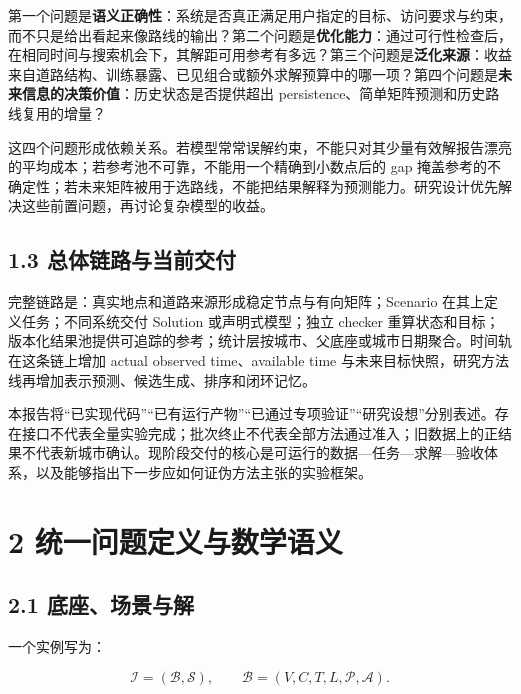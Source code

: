 \documentclass[UTF8,10pt,a4paper,fontset=fandol]{ctexart}
\begin{document}

第一个问题是\textbf{语义正确性}：系统是否真正满足用户指定的目标、访问要求与约束，而不只是给出看起来像路线的输出？第二个问题是\textbf{优化能力}：通过可行性检查后，在相同时间与搜索机会下，其解距可用参考有多远？第三个问题是\textbf{泛化来源}：收益来自道路结构、训练暴露、已见组合或额外求解预算中的哪一项？第四个问题是\textbf{未来信息的决策价值}：历史状态是否提供超出 persistence、简单矩阵预测和历史路线复用的增量？


这四个问题形成依赖关系。若模型常常误解约束，不能只对其少量有效解报告漂亮的平均成本；若参考池不可靠，不能用一个精确到小数点后的 gap 掩盖参考的不确定性；若未来矩阵被用于选路线，不能把结果解释为预测能力。研究设计优先解决这些前置问题，再讨论复杂模型的收益。


\subsection*{1.3 总体链路与当前交付}


完整链路是：真实地点和道路来源形成稳定节点与有向矩阵；Scenario 在其上定义任务；不同系统交付 Solution 或声明式模型；独立 checker 重算状态和目标；版本化结果池提供可追踪的参考；统计层按城市、父底座或城市日期聚合。时间轨在这条链上增加 actual observed time、available time 与未来目标快照，研究方法线再增加表示预测、候选生成、排序和闭环记忆。


本报告将“已实现代码”“已有运行产物”“已通过专项验证”“研究设想”分别表述。存在接口不代表全量实验完成；批次终止不代表全部方法通过准入；旧数据上的正结果不代表新城市确认。现阶段交付的核心是可运行的数据—任务—求解—验收体系，以及能够指出下一步应如何证伪方法主张的实验框架。


\section*{2 统一问题定义与数学语义}


\subsection*{2.1 底座、场景与解}


一个实例写为：


\begin{equation}
\mathcal I=(\mathcal B,\mathcal S),\qquad
\mathcal B=(V,C,T,L,\mathcal P,\mathcal A).
\end{equation}
\end{document}
